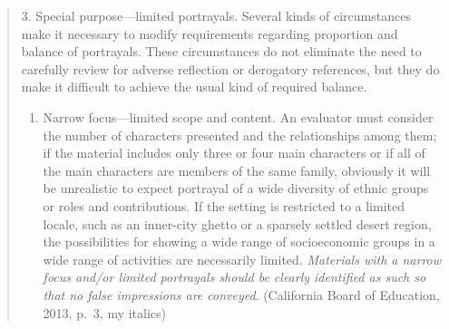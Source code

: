\begin{quote}
3. Special purpose—limited portrayals. Several kinds of circumstances make it necessary to modify requirements regarding proportion and balance of portrayals. These circumstances do not eliminate the need to carefully review for adverse reflection or derogatory references, but they do make it difficult to achieve the usual kind of required balance.
\renewcommand{\theenumi}{\alph{enumi}}
\renewcommand{\labelenumi}{\theenumi.}
\begin{enumerate}
\item Narrow focus—limited scope and content. An evaluator must consider the number of characters presented and the relationships among them; if the material includes only three or four main characters or if all of the main characters are members of the same family, obviously it will be unrealistic to expect portrayal of a wide diversity of ethnic groups or roles and contributions. If the setting is restricted to a limited locale, such as an inner-city ghetto or a sparsely settled desert region, the possibilities for showing a wide range of socioeconomic groups in a wide range of activities are necessarily limited. \textit{Materials with a narrow focus and/or limited portrayals should be clearly identified as such so that no false impressions are conveyed}. (California Board of Education, 2013, p.\ 3, my italics) 
\end{enumerate}
\end{quote}

